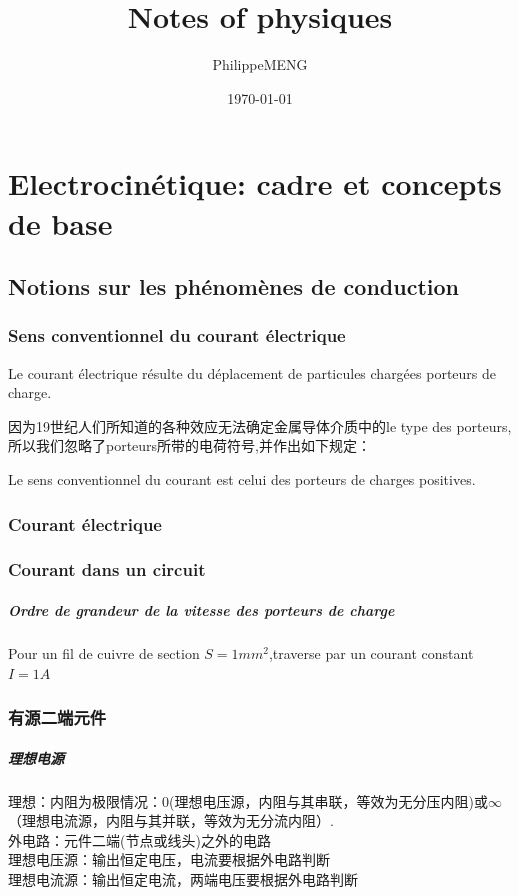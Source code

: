 \documentclass[12pt]{book}
\title{Notes of physiques}
\author{PhilippeMENG}
\date{\today}
\theoremstyle{definition}\newtheorem{dfn}{Définition}[chapter]
\theoremstyle{plain}\newtheorem{thm}{Théorème}[chapter]
\theoremstyle{plain}\newtheorem{prp}{Proposition}[chapter]
\theoremstyle{plain}\newtheorem{lem}{\bf Lemme}[chapter]
\theoremstyle{plain}\newtheorem{axm}{\bf Axiome}[chapter]
\theoremstyle{plain}\newtheorem{lmm}{\bf Lemme}[chapter]
\theoremstyle{plain}\newtheorem{cor}{\bf Corollaire}[chapter]
\theoremstyle{remark}\newtheorem{rem}{Remarque}[chapter]
\begin{document}
\maketitle
\tableofcontents
	\chapter{Electrocinétique: cadre et concepts de base}
	\section{Notions sur les phénomènes de conduction}
	\subsection{Sens conventionnel du courant électrique}
	Le courant électrique résulte du déplacement de particules chargées {\color{red} porteurs de charge}. 
	
	因为19世纪人们所知道的各种效应无法确定金属导体介质中的le type des porteurs,所以我们忽略了porteurs所带的电荷符号,并作出如下规定：
	
	
	Le sens conventionnel du courant est celui des porteurs de charges positives.

        
	\subsection{Courant électrique}
	\subsection{Courant dans un circuit}
	\paragraph{Ordre de grandeur de la vitesse des porteurs de charge}
	Pour un fil de cuivre de section $S=1mm^2$,traverse par un courant constant $I=1A$

\subsection{有源二端元件}
\paragraph{理想电源}理想：内阻为极限情况：$0$(理想电压源，内阻与其串联，等效为无分压内阻)或$\infty$（理想电流源，内阻与其并联，等效为无分流内阻）.
\\外电路：元件二端(节点或线头)之外的电路\\
理想电压源：输出恒定电压，电流要根据外电路判断
\\理想电流源：输出恒定电流，两端电压要根据外电路判断
\end{document}
